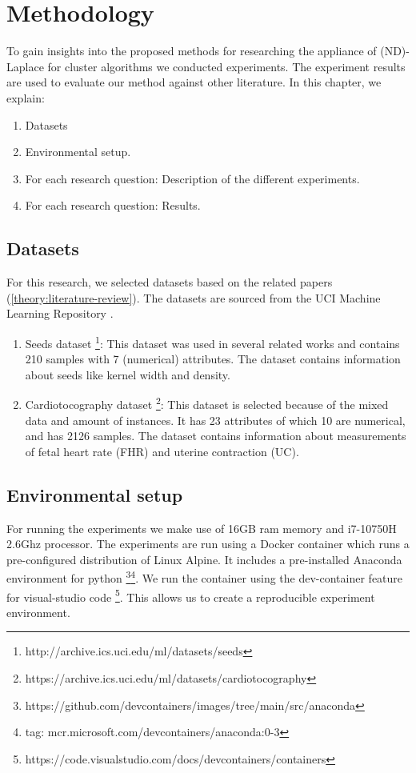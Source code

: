 \chapter{Methodology}

To gain insights into the proposed methods for researching the appliance of (ND)-Laplace for cluster algorithms we conducted experiments.
The experiment results are used to evaluate our method against other literature.
In this chapter, we explain:
\begin{enumerate}

  \item Datasets
  \item Environmental setup.
  \item For each research question: Description of the different experiments.
  \item For each research question: Results.
\end{enumerate}

\section{Datasets}
For this research, we selected datasets based on the related papers (\ref{theory:literature-review}).
The datasets are sourced from the UCI Machine Learning Repository \citep{noauthor_uci_nodate}.
\begin{enumerate}
  \item Seeds dataset \footnote{http://archive.ics.uci.edu/ml/datasets/seeds}: This dataset was used in several related works and contains 210 samples with 7 (numerical) attributes.
        The dataset contains information about seeds like kernel width and density.
  \item Cardiotocography dataset \footnote{https://archive.ics.uci.edu/ml/datasets/cardiotocography}: This dataset is selected because of the mixed data and amount of instances.
        It has 23 attributes of which 10 are numerical, and has 2126 samples.
        The dataset contains information about measurements of fetal heart rate (FHR) and uterine contraction (UC).
\end{enumerate}
\section{Environmental setup}
For running the experiments we make use of 16GB ram memory and i7-10750H 2.6Ghz processor.
The experiments are run using a Docker container which runs a pre-configured distribution of Linux Alpine.
It includes a pre-installed Anaconda environment for python \footnote{https://github.com/devcontainers/images/tree/main/src/anaconda}\footnote{tag: mcr.microsoft.com/devcontainers/anaconda:0-3}.
We run the container using the dev-container feature for visual-studio code \footnote{https://code.visualstudio.com/docs/devcontainers/containers}.
This allows us to create a reproducible experiment environment.
